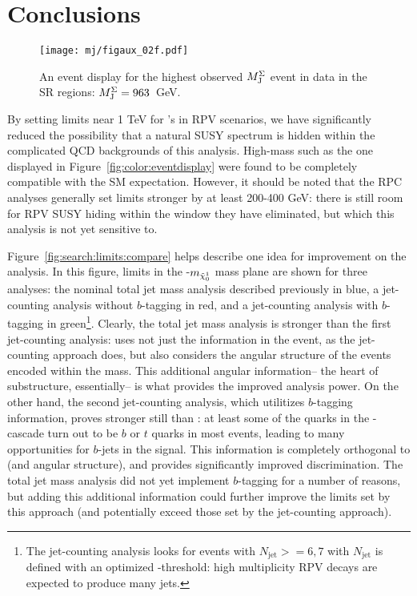 
\FloatBarrier

\section{Conclusions}



\begin{figure}
\centering
\texttt{[image: mj/figaux\_02f.pdf]}
\label{fig:search:conclusions:eventdisplay}
\caption{An event display for the highest observed $M_{\textrm{J}}^{\Sigma}$ event in data in the SR regions: $M_{\textrm{J}}^{\Sigma} = 963$~GeV.}
\end{figure}


By setting limits near 1 TeV for \gluino's in RPV scenarios, we have significantly reduced the possibility that a natural SUSY spectrum is hidden within the complicated QCD backgrounds of this analysis. High-mass such as the one displayed in Figure~\ref{fig:color:eventdisplay} were found to be completely compatible with the SM expectation. However, it should be noted that the RPC analyses generally set limits stronger by at least 200-400 GeV: there is still room for RPV SUSY hiding within the window they have eliminated, but which this analysis is not yet sensitive to.

Figure~\ref{fig:search:limits:compare} helps describe one idea for improvement on the analysis. In this figure, limits in the \mgluino-$m_{\tilde{\chi}_0^1}$ mass plane are shown for three analyses: the nominal total jet mass analysis described previously in blue, a jet-counting analysis without $b$-tagging in red, and a jet-counting analysis with $b$-tagging in green\footnote{The jet-counting analysis looks for events with $N_\mathrm{jet}>=6,7$ with $N_\mathrm{jet}$ is defined with an optimized \pt-threshold: high multiplicity RPV \gluino decays are expected to produce many jets.}. Clearly, the total jet mass analysis is stronger than the first jet-counting analysis: \MJ uses not just the \pt information in the event, as the jet-counting approach does, but also considers the angular structure of the events encoded within the mass. This additional angular information-- the heart of substructure, essentially-- is what provides the improved analysis power. On the other hand, the second jet-counting analysis, which utilitizes $b$-tagging information, proves stronger still than \MJ: at least some of the quarks in the \gluino-\lsp cascade turn out to be $b$ or $t$ quarks in most events, leading to many opportunities for $b$-jets in the signal. This information is completely orthogonal to \pt (and angular structure), and provides significantly improved discrimination. The total jet mass analysis did not yet implement $b$-tagging for a number of reasons, but adding this additional information could further improve the limits set by this approach (and potentially exceed those set by the jet-counting approach).


